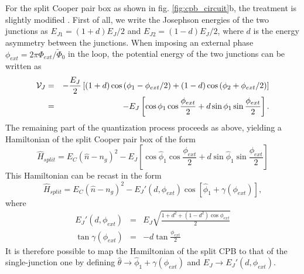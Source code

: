 For the split Cooper pair box as shown in fig. \ref{fig:cpb_circuit}b, the treatment is slightly modified \citep{cottet_implementation_2002}. First of all, we write the Josephson energies of the two junctions as $E_{J1}=(1+d)E_J/2$ and $E_{J2}=(1-d)E_J/2$, where $d$ is the energy asymmetry between the junctions. When imposing an external phase $\phi_{ext}=2\pi\Phi_{ext}/\tilde{\Phi}_0$ in the loop, the potential energy of the two junctions can be written as
%
\begin{eqnarray}
\begin{mathcal}V\end{mathcal}_J & = & -\frac{E_J}{2}\left[(1+d)\cos{(\phi_1-\phi_{ext}/2)}+(1-d)\cos{(\phi_2+\phi_{ext}/2)} \right] \\
& = & -E_J\left[\cos{\phi_1}\cos{\frac{\phi_{ext}}{2}}+d\sin{\phi_1}\sin{\frac{\phi_{ext}}{2}}\right].
\end{eqnarray}
%
The remaining part of the quantization process proceeds as above, yielding a Hamiltonian of the split Cooper pair box of the form
%
\begin{equation}
\hat{H}_{split} = E_C(\hat{n}-n_g)^2-E_J\left[\cos{\hat{\phi}_1}\cos{\frac{\phi_{ext}}{2}}+d\sin{\hat{\phi}_1}\sin{\frac{\phi_{ext}}{2}}\right]
\end{equation}
%
This Hamiltonian can be recast in the form \citep{cottet_implementation_2002}
%
\begin{equation}
\hat{H}_{split} = E_C(\hat{n}-n_g)^2-E_J'(d,\phi_{ext})\cos{[\hat{\phi}_1+\gamma(\phi_{ext})]},
\end{equation}
%
where
%
\begin{eqnarray}
E_J'(d,\phi_{ext}) & = & E_J\sqrt{\frac{1+d^2+(1-d^2)\cos{\phi_{ext}}}{2}} \\
\tan{\gamma(\phi_{ext})} & = & -d\tan{\frac{\phi_{ext}}{2}} \label{eq:josephson_energy_modulation}
\end{eqnarray}
%
It is therefore possible to map the Hamiltonian of the split CPB to that of the single-junction one by defining $\hat{\theta}\to\hat{\phi}_1+\gamma(\phi_{ext})$ and $E_J\to E_J'(d,\phi_{ext})$. 

